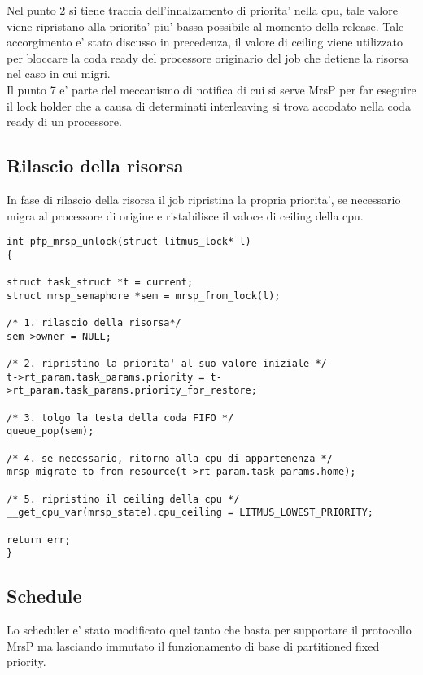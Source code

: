 \documentclass[a4paper,11pt]{article}
\begin{document}
\noindent Nel punto 2 si tiene traccia dell'innalzamento di priorita' nella cpu, tale valore viene ripristano alla priorita' piu' bassa possibile al momento della release. Tale accorgimento e' stato discusso in precedenza, il valore di ceiling viene utilizzato per bloccare la coda ready del processore originario del job che detiene la risorsa nel caso in cui migri.\\

\noindent Il punto 7 e' parte del meccanismo di notifica di cui si serve MrsP per far eseguire il lock holder che a causa di determinati interleaving si trova accodato nella coda ready di un processore.\\

\subsection{Rilascio della risorsa}

\noindent In fase di rilascio della risorsa il job ripristina la propria priorita', se necessario migra al processore di origine e ristabilisce il valoce di ceiling della cpu.\\

\begin{lstlisting}
int pfp_mrsp_unlock(struct litmus_lock* l)
{

struct task_struct *t = current;
struct mrsp_semaphore *sem = mrsp_from_lock(l); 

/* 1. rilascio della risorsa*/	
sem->owner = NULL;

/* 2. ripristino la priorita' al suo valore iniziale */
t->rt_param.task_params.priority = t->rt_param.task_params.priority_for_restore;

/* 3. tolgo la testa della coda FIFO */
queue_pop(sem);

/* 4. se necessario, ritorno alla cpu di appartenenza */
mrsp_migrate_to_from_resource(t->rt_param.task_params.home);

/* 5. ripristino il ceiling della cpu */
__get_cpu_var(mrsp_state).cpu_ceiling = LITMUS_LOWEST_PRIORITY;

return err;
}
\end{lstlisting}

\subsection{Schedule}

\noindent Lo scheduler e' stato modificato quel tanto che basta per supportare il protocollo MrsP ma lasciando immutato il funzionamento di base di partitioned fixed priority.\\
\end{document}
